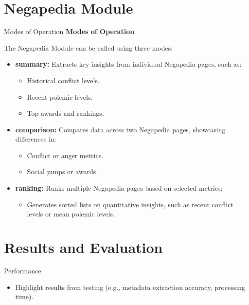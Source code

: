 \documentclass{beamer}
\begin{document}
\section{Negapedia Module}
    \begin{frame}{Modes of Operation}
        \textbf{Modes of Operation}
        
        The Negapedia Module can be called using three modes:
            \begin{itemize}
                \item \textbf{summary:}
                    Extracts key insights from individual Negapedia pages, such as:
                    \begin{itemize}
                        \item Historical conflict levels.
                        \item Recent polemic levels.
                        \item Top awards and rankings.
                    \end{itemize}
                \item \textbf{comparison:}
                    Compares data across two Negapedia pages, showcasing differences in:
                    \begin{itemize}
                        \item Conflict or anger metrics.
                        \item Social jumps or awards.
                    \end{itemize}
                \item \textbf{ranking:}
                    Ranks multiple Negapedia pages based on selected metrics:
                    \begin{itemize}
                        \item Generates sorted lists on quantitative insights, such as recent conflict levels or mean polemic levels.
                    \end{itemize}
            \end{itemize}
    \end{frame}


\section{Results and Evaluation}
    \begin{frame}{Performance}
        \begin{itemize}
            \item Highlight results from testing (e.g., metadata extraction accuracy, processing time).
        \end{itemize}
    \end{frame}
\end{document}
